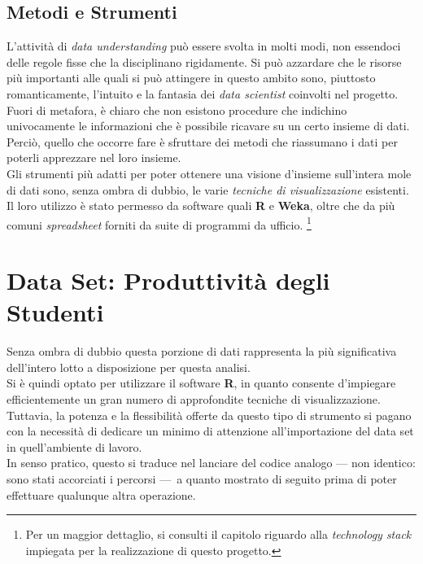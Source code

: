         \subsection{Metodi e Strumenti}

            L'attività di \textit{data understanding} può essere svolta in molti modi, non essendoci delle regole fisse che la disciplinano rigidamente. Si può azzardare che le risorse più importanti alle quali si può attingere in questo ambito sono, piuttosto romanticamente, l'intuito e la fantasia dei \textit{data scientist} coinvolti nel progetto. Fuori di metafora, è chiaro che non esistono procedure che indichino univocamente le informazioni che è possibile ricavare su un certo insieme di dati. Perciò, quello che occorre fare è sfruttare dei metodi che riassumano i dati per poterli apprezzare nel loro insieme. \\

            Gli strumenti più adatti per poter ottenere una visione d'insieme sull'intera mole di dati sono, senza ombra di dubbio, le varie \textit{tecniche di visualizzazione} esistenti. Il loro utilizzo è stato permesso da software quali \textbf{R} e \textbf{Weka}, oltre che da più comuni \textit{spreadsheet} forniti da suite di programmi da ufficio. \footnote{Per un maggior dettaglio, si consulti il capitolo riguardo alla \textit{technology stack} impiegata per la realizzazione di questo progetto.}

    \section{Data Set: Produttività degli Studenti}

        Senza ombra di dubbio questa porzione di dati rappresenta la più significativa dell'intero lotto a disposizione per questa analisi. \\

        Si è quindi optato per utilizzare il software \textbf{R}, in quanto consente d'impiegare efficientemente un gran numero di approfondite tecniche di visualizzazione. Tuttavia, la potenza e la flessibilità offerte da questo tipo di strumento si pagano con la necessità di dedicare un minimo di attenzione all'importazione del data set in quell'ambiente di lavoro. \\

        In senso pratico, questo si traduce nel lanciare del codice analogo \footnotesize{--- non identico: sono stati accorciati i percorsi ---}\normalsize\ a quanto mostrato di seguito prima di poter effettuare qualunque altra operazione. \\

